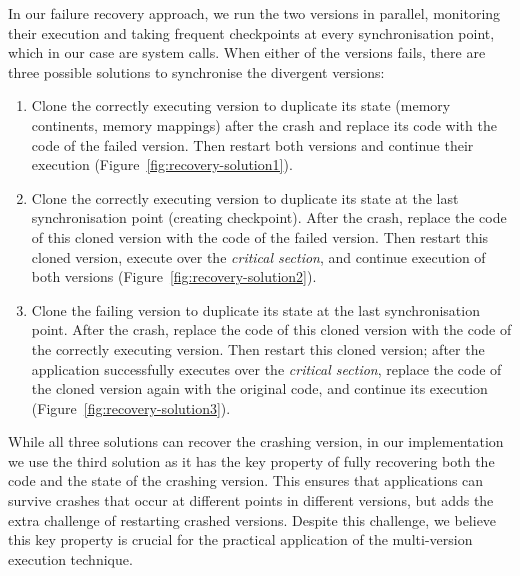 In our failure recovery approach, we run the two versions in parallel,
monitoring their execution and taking frequent checkpoints at every
synchronisation point, which in our case are system calls. When either of the
versions fails, there are three possible solutions to synchronise the divergent
versions:%
\begin{enumerate}
\item\label{s1} Clone the correctly executing version to duplicate its state
  (\eg memory continents, memory mappings) after the crash and replace its
  code with the code of the failed version. Then restart both versions and
  continue their execution (Figure~\ref{fig:recovery-solution1}).
\item\label{s2} Clone the correctly executing version to duplicate its state at
  the last synchronisation point (\ie creating checkpoint). After the crash,
  replace the code of this cloned version with the code of the failed version.
  Then restart this cloned version, execute over the \emph{critical section},
  and continue execution of both versions
  (Figure~\ref{fig:recovery-solution2}).
\item\label{s3} Clone the failing version to duplicate its state at the last
  synchronisation point. After the crash, replace the code of this cloned
  version with the code of the correctly executing version. Then restart this
  cloned version; after the application successfully executes over the
  \emph{critical section}, replace the code of the cloned version again with
  the original code, and continue its execution
  (Figure~\ref{fig:recovery-solution3}).
\end{enumerate}

While all three solutions can recover the crashing version, in our
implementation we use the third solution as it has the key property of fully
recovering both the code and the state of the crashing version.  This ensures
that applications can survive crashes that occur at different points in
different versions, but adds the extra challenge of restarting crashed
versions. Despite this challenge, we believe this key property is crucial for
the practical application of the multi-version execution technique.


